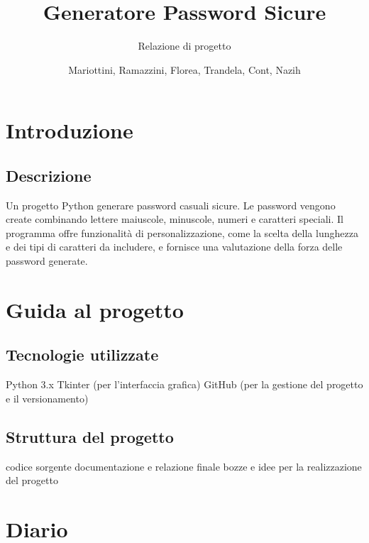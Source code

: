 \documentclass{scrartcl}
\title{Generatore Password Sicure}
\subtitle{Relazione di progetto}
\author{Mariottini, Ramazzini, Florea, Trandela, Cont, Nazih}
\date{}
\begin{document}
    \maketitle

    \section{Introduzione}

        \subsection{Descrizione}

            Un progetto Python generare password casuali sicure. Le password vengono create combinando lettere maiuscole, minuscole, numeri e caratteri speciali. Il programma offre funzionalità di personalizzazione, come la scelta della lunghezza e dei tipi di caratteri da includere, e fornisce una valutazione della forza delle password generate.

    \section{Guida al progetto}

        \subsection{Tecnologie utilizzate}

            \begin{outline}            
                \1 Python 3.x
                \1 Tkinter (per l'interfaccia grafica)
                \1 GitHub (per la gestione del progetto e il versionamento)
            \end{outline}

        \subsection{Struttura del progetto}

            \begin{outline}
                \1  codice sorgente
                \1  documentazione e relazione finale
                \1  bozze e idee per la realizzazione del progetto
            \end{outline}

    \section{Diario}
\end{document}
